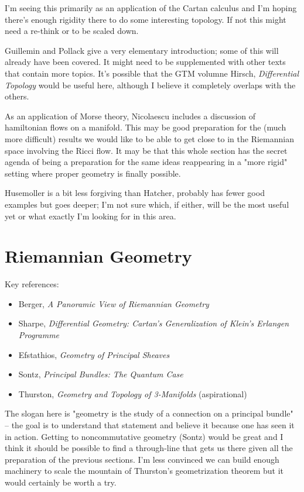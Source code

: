 \documentclass[article]{article}
\begin{document}
I'm seeing this primarily as an application of the Cartan calculus and I'm hoping there's enough rigidity there to do some interesting topology. If not this might need a re-think or to be scaled down.

Guillemin and Pollack give a very elementary introduction; some of this will already have been covered. It might need to be supplemented with other texts that contain more topics. It's possible that the GTM volumne Hirsch, \textit{Differential Topology} would be useful here, although I believe it completely overlaps with the others.

As an application of Morse theory, Nicolaescu includes a discussion of hamiltonian flows on a manifold. This may be good preparation for the (much more difficult) results we would like to be able to get close to in the Riemannian space involving the Ricci flow. It may be that this whole section has the secret agenda of being a preparation for the same ideas reappearing in a "more rigid" setting where proper geometry is finally possible.

Husemoller is a bit less forgiving than Hatcher, probably has fewer good examples but goes deeper; I'm not sure which, if either, will be the most useful yet or what exactly I'm looking for in this area.

\section{Riemannian Geometry}

Key references:
\begin{itemize}
	\item{Berger, \textit{A Panoramic View of Riemannian Geometry}}
	\item{Sharpe, \textit{Differential Geometry: Cartan’s Generalization of Klein’s Erlangen Programme}}
	\item{Efstathios, \textit{Geometry of Principal Sheaves}}
	\item{Sontz, \textit{Principal Bundles: The Quantum Case}}
	\item{Thurston, \textit{Geometry and Topology of 3-Manifolds} (aspirational)}
\end{itemize}

The slogan here is "geometry is the study of a connection on a principal bundle" -- the goal is to understand that statement and believe it because one has seen it in action. Getting to noncommutative geometry (Sontz) would be great and I think it should be possible to find a through-line that gets us there given all the preparation of the previous sections. I'm less convinced we can build enough machinery to scale the mountain of Thurston's geometrization theorem but it would certainly be worth a try.
\end{document}
